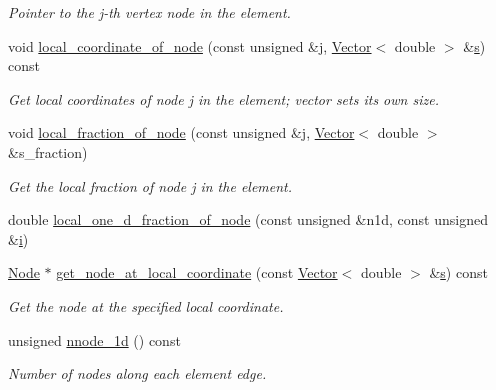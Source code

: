 \begin{DoxyCompactItemize}
\begin{DoxyCompactList}\small\item\em Pointer to the j-\/th vertex node in the element. \end{DoxyCompactList}\item 
void \hyperlink{classoomph_1_1QElement_3_013_00_01NNODE__1D_01_4_ae553b0a2f167d83dc7da8c57b82b5fdd}{local\+\_\+coordinate\+\_\+of\+\_\+node} (const unsigned \&j, \hyperlink{classoomph_1_1Vector}{Vector}$<$ double $>$ \&\hyperlink{cfortran_8h_ab7123126e4885ef647dd9c6e3807a21c}{s}) const
\begin{DoxyCompactList}\small\item\em Get local coordinates of node j in the element; vector sets its own size. \end{DoxyCompactList}\item 
void \hyperlink{classoomph_1_1QElement_3_013_00_01NNODE__1D_01_4_a702b787cd3fbb7b1b2d9054860f2d9c0}{local\+\_\+fraction\+\_\+of\+\_\+node} (const unsigned \&j, \hyperlink{classoomph_1_1Vector}{Vector}$<$ double $>$ \&s\+\_\+fraction)
\begin{DoxyCompactList}\small\item\em Get the local fraction of node j in the element. \end{DoxyCompactList}\item 
double \hyperlink{classoomph_1_1QElement_3_013_00_01NNODE__1D_01_4_a1485bee3b772edabe9ab4e576031fd45}{local\+\_\+one\+\_\+d\+\_\+fraction\+\_\+of\+\_\+node} (const unsigned \&n1d, const unsigned \&\hyperlink{cfortran_8h_adb50e893b86b3e55e751a42eab3cba82}{i})
\item 
\hyperlink{classoomph_1_1Node}{Node} $\ast$ \hyperlink{classoomph_1_1QElement_3_013_00_01NNODE__1D_01_4_aa1429001a31632bbcdb4d8660b13777c}{get\+\_\+node\+\_\+at\+\_\+local\+\_\+coordinate} (const \hyperlink{classoomph_1_1Vector}{Vector}$<$ double $>$ \&\hyperlink{cfortran_8h_ab7123126e4885ef647dd9c6e3807a21c}{s}) const
\begin{DoxyCompactList}\small\item\em Get the node at the specified local coordinate. \end{DoxyCompactList}\item 
unsigned \hyperlink{classoomph_1_1QElement_3_013_00_01NNODE__1D_01_4_a3de3fa35517dc2b5bd7b2e90069dc761}{nnode\+\_\+1d} () const
\begin{DoxyCompactList}\small\item\em Number of nodes along each element edge. \end{DoxyCompactList}\item 

\end{DoxyCompactItemize}
